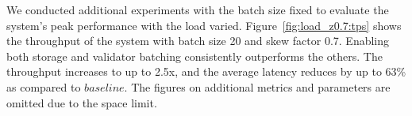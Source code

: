 We conducted additional experiments with the batch size fixed to evaluate the system's peak performance with the load varied. Figure~\ref{fig:load_z0.7:tps} shows the throughput of the system with batch size 20 and skew factor 0.7. Enabling both storage and validator batching consistently outperforms the others. The throughput increases to up to 2.5x, and the average latency reduces by up to 63\% as compared to $baseline$. The figures on additional metrics and parameters are omitted due to the space limit.

